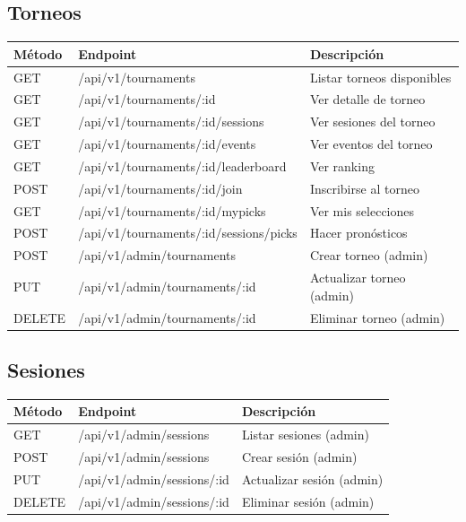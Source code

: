 \documentclass[12pt,a4paper]{article}
\begin{document}
\subsection{Torneos}
\begin{tabular}{|l|l|p{6cm}|}
\hline
\textbf{Método} & \textbf{Endpoint} & \textbf{Descripción} \\
\hline
GET & /api/v1/tournaments & Listar torneos disponibles \\
GET & /api/v1/tournaments/:id & Ver detalle de torneo \\
GET & /api/v1/tournaments/:id/sessions & Ver sesiones del torneo \\
GET & /api/v1/tournaments/:id/events & Ver eventos del torneo \\
GET & /api/v1/tournaments/:id/leaderboard & Ver ranking \\
POST & /api/v1/tournaments/:id/join & Inscribirse al torneo \\
GET & /api/v1/tournaments/:id/mypicks & Ver mis selecciones \\
POST & /api/v1/tournaments/:id/sessions/picks & Hacer pronósticos \\
POST & /api/v1/admin/tournaments & Crear torneo (admin) \\
PUT & /api/v1/admin/tournaments/:id & Actualizar torneo (admin) \\
DELETE & /api/v1/admin/tournaments/:id & Eliminar torneo (admin) \\
\end{tabular}

\subsection{Sesiones}
\begin{tabular}{|l|l|p{6cm}|}
\hline
\textbf{Método} & \textbf{Endpoint} & \textbf{Descripción} \\
\hline
GET & /api/v1/admin/sessions & Listar sesiones (admin) \\
POST & /api/v1/admin/sessions & Crear sesión (admin) \\
PUT & /api/v1/admin/sessions/:id & Actualizar sesión (admin) \\
DELETE & /api/v1/admin/sessions/:id & Eliminar sesión (admin) \\
\end{tabular}
\end{document}

